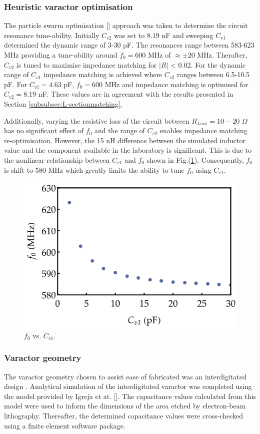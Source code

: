\subsubsection{\label{subsubsec:Heuristicvaractoroptimisation}Heuristic varactor optimisation}
\noindent The particle swarm optimisation [] approach was taken to determine the circuit resonance tune-ability. Initially $C_{v2}$ was set to $8.19$ nF and sweeping $C_{v1}$ determined the dynamic range of 3-30 pF. The resonances range between 583-623 MHz providing a tune-ability around $f_{0}=600$ MHz of $\approx \pm 20$ MHz. Therafter, $C_{v2}$ is tuned to maximise impedance matching for $\left | R\right |$ < 0.02. For the dynamic range of $C_{v1}$ impedance matching is achieved where $C_{v2}$ ranges between 6.5-10.5 pF. For $C_{v1}=4.63$ pF, $f_{0}=600$ MHz and impedance matching is optimised for $C_{v2}=8.19$ nF. These values are in agreement with the results presented in Section \ref{subsubsec:L-sectionmatching}. 

Additionally, varying the resistive loss of the circuit between $R_{Loss}=10-20$ $\Omega$ has no significant effect of $f_{0}$ and the range of $C_{v2}$ enables impedance matching re-optimisation. However, the 15 nH difference between the simulated inductor value and the component available in the laboratory is significant. This is due to the nonlinear relationship between $C_{v1}$ and $f_{0}$ shown in Fig.(\ref{fig:f_0vsC_v1}). Consequently, $f_{0}$ is shift to 580 MHz which greatly limits the ability to tune $f_{0}$ using $C_{v1}$.  

    
\begin{figure}[t]
\centering
\includegraphics[height=0.3\textwidth,keepaspectratio]{f_0vsC_v1}
\caption{\label{fig:f_0vsC_v1} $f_{0}$ vs. $C_{v1}$.}
\end{figure}


\subsubsection{\label{subsec:Varactorgeometry}Varactor geometry}
The varactor geometry chosen to assist ease of fabricated was an interdigitated design \citep{PhysRevB.19.3593}. Analytical simulation of the interdigitated varactor was completed using the model provided by Igreja et at. [\citep{Igreja2004AnalyticalStructure}]. The capacitance values calculated from this model were used to inform the dimensions of the area etched by electron-beam lithography. Thereafter, the determined capacitance values were cross-checked using a finite element software package. 

